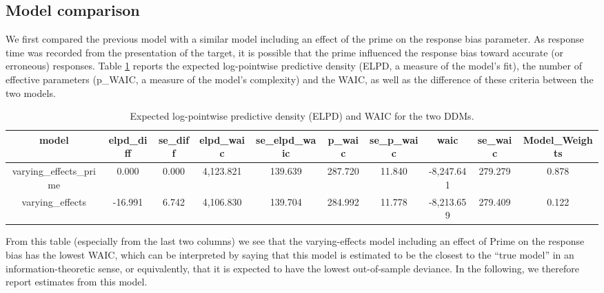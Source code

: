 \documentclass[
  11pt,
  english,
  ,doc,floatsintext]{apa6}
\begin{document}
\hypertarget{model-comparison}{%
\subsection{Model comparison}\label{model-comparison}}

We first compared the previous model with a similar model including an effect of the prime on the response bias parameter. As response time was recorded from the presentation of the target, it is possible that the prime influenced the response bias toward accurate (or erroneous) responses. Table \ref{tab:model_comparison} reports the expected log-pointwise predictive density (ELPD, a measure of the model's fit), the number of effective parameters (p\_WAIC, a measure of the model's complexity) and the WAIC, as well as the difference of these criteria between the two models.

\begin{table}[htb]

\begin{center}
\begin{threeparttable}

\caption{\label{tab:model_comparison}Expected log-pointwise predictive density (ELPD) and WAIC for the two DDMs.}

\tiny{

\begin{tabular}{cccccccccc}
\toprule
model & \multicolumn{1}{c}{elpd\_diff} & \multicolumn{1}{c}{se\_diff} & \multicolumn{1}{c}{elpd\_waic} & \multicolumn{1}{c}{se\_elpd\_waic} & \multicolumn{1}{c}{p\_waic} & \multicolumn{1}{c}{se\_p\_waic} & \multicolumn{1}{c}{waic} & \multicolumn{1}{c}{se\_waic} & \multicolumn{1}{c}{Model\_Weights}\\
\midrule
varying\_effects\_prime & 0.000 & 0.000 & 4,123.821 & 139.639 & 287.720 & 11.840 & -8,247.641 & 279.279 & 0.878\\
varying\_effects & -16.991 & 6.742 & 4,106.830 & 139.704 & 284.992 & 11.778 & -8,213.659 & 279.409 & 0.122\\
\bottomrule
\end{tabular}

}

\end{threeparttable}
\end{center}

\end{table}

From this table (especially from the last two columns) we see that the varying-effects model including an effect of Prime on the response bias has the lowest WAIC, which can be interpreted by saying that this model is estimated to be the closest to the \enquote{true model} in an information-theoretic sense, or equivalently, that it is expected to have the lowest out-of-sample deviance. In the following, we therefore report estimates from this model.
\end{document}
